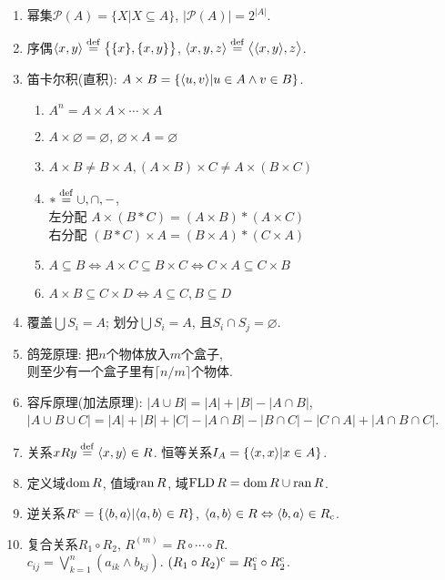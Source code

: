 \begin{enumerate}

\item 幂集$\mathscr{P}(A)=\{X|X\subseteq A\}$, $|\mathscr{P}(A)|=2^{|A|}$.\
\item 序偶$\langle x,y\rangle\stackrel{\rm def}{=} \big\{\{x\}, \{x,y\}\big\}$, $\langle x,y,z\rangle\stackrel{\rm def}{=} \big\langle\langle x,y\rangle,z\big\rangle$.
\item 笛卡尔积(直积): $A\times B=\{\langle u,v\rangle|u\in A\wedge v\in B\}$.
\begin{enumerate}
\item $A^n=A\times A\times\cdots\times A$
\item $A\times \varnothing=\varnothing$, $\varnothing\times A=\varnothing$
\item $A\times B\neq B\times A, (A\times B)\times C\neq A\times(B\times C)$
\item $*\stackrel{\rm def}{=} \cup, \cap, -$,\\
左分配 $A\times(B*C)=(A\times B)*(A\times C)$\\
右分配 $(B*C)\times A=(B\times A)*(C\times A)$
\item $A\subseteq B\Leftrightarrow A\times C\subseteq B\times C\Leftrightarrow C\times A\subseteq C\times B$
\item $A\times B\subseteq C\times D\Leftrightarrow A\subseteq C, B\subseteq D$
\end{enumerate}
\item 覆盖$\bigcup S_i=A$; 划分$\bigcup S_i=A$, 且$S_i\cap S_j=\varnothing$.
\item 鸽笼原理: 把$n$个物体放入$m$个盒子, \\则至少有一个盒子里有$\lceil n/m \rceil$个物体.
\item 容斥原理(加法原理): $|A\cup B|=|A|+|B|-|A\cap B|$,\\
$|A\cup B\cup C|=|A|+|B|+|C|-|A\cap B|-|B\cap C|-|C\cap A|+|A\cap B\cap C|$.

\item 关系$xRy\stackrel{\rm def}{=} \langle x,y\rangle\in R$. 恒等关系$I_A=\{\langle x,x\rangle|x\in A\}$.
\item 定义域$\operatorname{dom} R$, 值域$\operatorname{ran} R$, 域$\operatorname{FLD} R=\operatorname{dom} R\cup\operatorname{ran} R$.
\item 逆关系$R^{\mathrm{c}}=\{\langle b,a\rangle|\langle a,b\rangle\in R\}$, $\langle a,b\rangle\in R\Leftrightarrow\langle b,a\rangle\in R_{\mathrm{c}}$.
\item 复合关系$R_1\circ R_2$, $R^{(m)}=R\circ\cdots\circ R$.\\
$c_{ij}=\bigvee_{k=1}^n(a_{ik}\wedge b_{kj})$. $(R_1\circ R_2)^{\mathrm{c}}=R_1^{\mathrm{c}}\circ R_2^{\mathrm{c}}$.


\end{enumerate}
